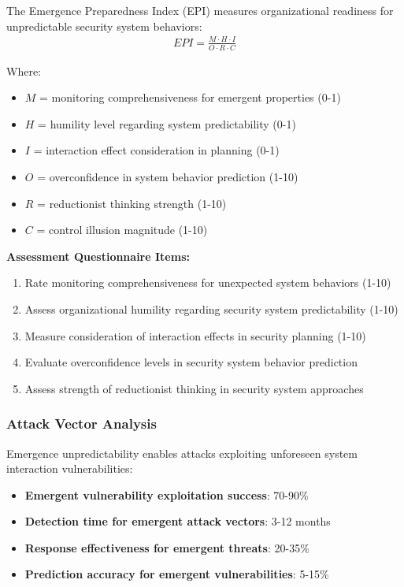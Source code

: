 \documentclass[11pt,a4paper]{article}
\begin{document}
The Emergence Preparedness Index (EPI) measures organizational readiness for unpredictable security system behaviors:
\begin{align}
EPI = \frac{M \cdot H \cdot I}{O \cdot R \cdot C}
\end{align}

Where:
\begin{itemize}
\item $M$ = monitoring comprehensiveness for emergent properties (0-1)
\item $H$ = humility level regarding system predictability (0-1)
\item $I$ = interaction effect consideration in planning (0-1)
\item $O$ = overconfidence in system behavior prediction (1-10)
\item $R$ = reductionist thinking strength (1-10)
\item $C$ = control illusion magnitude (1-10)
\end{itemize}

\textbf{Assessment Questionnaire Items:}
\begin{enumerate}
\item Rate monitoring comprehensiveness for unexpected system behaviors (1-10)
\item Assess organizational humility regarding security system predictability (1-10)
\item Measure consideration of interaction effects in security planning (1-10)
\item Evaluate overconfidence levels in security system behavior prediction
\item Assess strength of reductionist thinking in security system approaches
\end{enumerate}

\subsubsection{Attack Vector Analysis}

Emergence unpredictability enables attacks exploiting unforeseen system interaction vulnerabilities:

\begin{itemize}
\item \textbf{Emergent vulnerability exploitation success}: 70-90\%
\item \textbf{Detection time for emergent attack vectors}: 3-12 months
\item \textbf{Response effectiveness for emergent threats}: 20-35\%
\item \textbf{Prediction accuracy for emergent vulnerabilities}: 5-15\%
\end{itemize}
\end{document}
